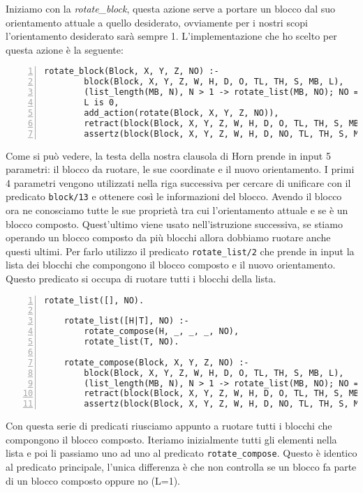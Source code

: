 Iniziamo con la \textit{rotate\_block}, questa azione serve a portare un blocco dal suo orientamento attuale a quello desiderato, ovviamente per i nostri scopi l'orientamento desiderato sarà sempre 1.
L'implementazione che ho scelto per questa azione è la seguente:
\begin{Verbatim}[numbers=left]
    rotate_block(Block, X, Y, Z, NO) :-
        block(Block, X, Y, Z, W, H, D, O, TL, TH, S, MB, L),
        (list_length(MB, N), N > 1 -> rotate_list(MB, NO); NO = NO),
        L is 0,
        add_action(rotate(Block, X, Y, Z, NO)),
        retract(block(Block, X, Y, Z, W, H, D, O, TL, TH, S, MB, L)),
        assertz(block(Block, X, Y, Z, W, H, D, NO, TL, TH, S, MB, L)).
\end{Verbatim}
Come si può vedere, la testa della nostra clausola di Horn prende in input 5 parametri: il blocco da ruotare, le sue coordinate e il nuovo orientamento. I primi 4 parametri vengono utilizzati nella riga successiva per cercare di unificare con il predicato \verb+block/13+ e ottenere così le informazioni del blocco.
Avendo il blocco ora ne conosciamo tutte le sue proprietà tra cui l'orientamento attuale e se è un blocco composto. Quest'ultimo viene usato nell'istruzione successiva, se stiamo operando un blocco composto da più blocchi allora dobbiamo ruotare anche questi ultimi. Per farlo utilizzo il predicato \verb+rotate_list/2+ che prende in input la lista dei blocchi che compongono il blocco composto e il nuovo orientamento. Questo predicato si occupa di ruotare tutti i blocchi della lista.
\begin{Verbatim}[numbers=left]
    rotate_list([], NO).

    rotate_list([H|T], NO) :-
        rotate_compose(H, _, _, _, NO),
        rotate_list(T, NO).

    rotate_compose(Block, X, Y, Z, NO) :-
        block(Block, X, Y, Z, W, H, D, O, TL, TH, S, MB, L),
        (list_length(MB, N), N > 1 -> rotate_list(MB, NO); NO = NO),
        retract(block(Block, X, Y, Z, W, H, D, O, TL, TH, S, MB, L)),
        assertz(block(Block, X, Y, Z, W, H, D, NO, TL, TH, S, MB, L)).
\end{Verbatim}
Con questa serie di predicati riusciamo appunto a ruotare tutti i blocchi che compongono il blocco composto. Iteriamo inizialmente tutti gli elementi nella lista e poi li passiamo uno ad uno al predicato \verb+rotate_compose+. Questo è identico al predicato principale, l'unica differenza è che non controlla se un blocco fa parte di un blocco composto oppure no (L=1).

